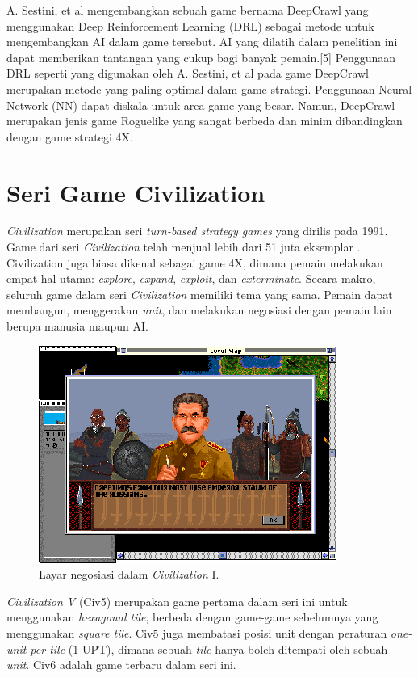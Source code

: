 A. Sestini, et al \citep{deepCrawl} mengembangkan sebuah game bernama DeepCrawl yang menggunakan Deep Reinforcement Learning (DRL) sebagai metode untuk mengembangkan AI dalam game tersebut. AI yang dilatih dalam penelitian ini dapat memberikan tantangan yang cukup bagi banyak pemain.[5] Penggunaan DRL seperti yang digunakan oleh A. Sestini, et al pada game DeepCrawl merupakan metode yang paling optimal dalam game strategi. Penggunaan Neural Network (NN) dapat diskala untuk area game yang besar. Namun, DeepCrawl merupakan jenis game Roguelike yang sangat berbeda dan minim dibandingkan dengan game strategi 4X.

\section{Seri Game Civilization}
\emph{Civilization} merupakan seri \emph{turn-based strategy games} yang dirilis pada 1991. 
Game dari seri \emph{Civilization} telah menjual lebih dari 51 juta eksemplar \citep{civ6CopiesSold}.
Civilization juga biasa dikenal sebagai game 4X,
dimana pemain melakukan empat hal utama: \emph{explore}, \emph{expand}, \emph{exploit}, dan \emph{exterminate}. Secara makro, seluruh game
dalam seri \emph{Civilization} memiliki tema yang sama. Pemain dapat membangun, menggerakan \emph{unit}, dan melakukan negosiasi dengan pemain lain
berupa manusia maupun AI.

\begin{figure}[H]
  \centering
    \includegraphics[scale=1]{gambar/Civ_1_negotiation.png}
    \caption{Layar negosiasi dalam \emph{Civilization} I.}
    \label{fig:civ1Negotiation}
\end{figure}

\emph{Civilization V} (Civ5) merupakan game pertama dalam seri ini untuk menggunakan \emph{hexagonal tile},
berbeda dengan game-game sebelumnya yang menggunakan \emph{square tile}. Civ5 juga membatasi posisi unit dengan peraturan \emph{one-unit-per-tile}
(1-UPT), dimana sebuah \emph{tile} hanya boleh ditempati oleh sebuah \emph{unit}.
Civ6 adalah game terbaru dalam seri ini. 

